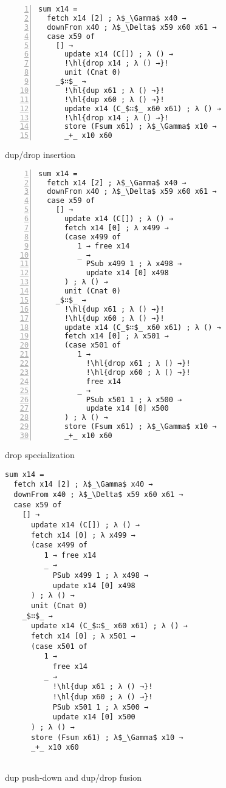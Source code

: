 \documentclass[9pt, twocolumn]{article}
\newcommand{\hl}[2][lightgray]{\colorbox{#1}{#2}}
\begin{document}
\begin{figure*}[hp]
\begin{mdframed}
\centering
\setlength{\fboxsep}{0pt} %
\begin{subfigure}[t]{0.44\textwidth}
\centering
\begin{lstlisting}[numbers=left]
sum x14 =
  fetch x14 [2] ; λ$_\Gamma$ x40 →
  downFrom x40 ; λ$_\Delta$ x59 x60 x61 →
  case x59 of
    [] →
      update x14 (C[]) ; λ () →
      !\hl{drop x14 ; λ () →}!
      unit (Cnat 0)
    _$∷$_ →
      !\hl{dup x61 ; λ () →}!
      !\hl{dup x60 ; λ () →}!
      update x14 (C_$∷$_ x60 x61) ; λ () →
      !\hl{drop x14 ; λ () →}!
      store (Fsum x61) ; λ$_\Gamma$ x10 →
      _+_ x10 x60
\end{lstlisting}
\caption{dup/drop insertion}
\label{fig:drop-insert}
\end{subfigure}\par\medskip
\begin{subfigure}[b]{0.44\textwidth}
\centering
\begin{lstlisting}[numbers=left]
sum x14 =
  fetch x14 [2] ; λ$_\Gamma$ x40 →
  downFrom x40 ; λ$_\Delta$ x59 x60 x61 →
  case x59 of
    [] →
      update x14 (C[]) ; λ () →
      fetch x14 [0] ; λ x499 →
      (case x499 of
         1 → free x14
         _ →
           PSub x499 1 ; λ x498 →
           update x14 [0] x498
      ) ; λ () →
      unit (Cnat 0)
    _$∷$_ →
      !\hl{dup x61 ; λ () →}!
      !\hl{dup x60 ; λ () →}!
      update x14 (C_$∷$_ x60 x61) ; λ () →
      fetch x14 [0] ; λ x501 →
      (case x501 of
         1 →
           !\hl{drop x61 ; λ () →}!
           !\hl{drop x60 ; λ () →}!
           free x14
         _ →
           PSub x501 1 ; λ x500 →
           update x14 [0] x500
      ) ; λ () →
      store (Fsum x61) ; λ$_\Gamma$ x10 →
      _+_ x10 x60
\end{lstlisting}
\caption{drop specialization}
\label{fig:drop-spec}
\end{subfigure}
\begin{subfigure}[b]{0.44\textwidth}
\begin{lstlisting}[showlines=true, numbers=none]
sum x14 =
  fetch x14 [2] ; λ$_\Gamma$ x40 →
  downFrom x40 ; λ$_\Delta$ x59 x60 x61 →
  case x59 of
    [] →
      update x14 (C[]) ; λ () →
      fetch x14 [0] ; λ x499 →
      (case x499 of
         1 → free x14
         _ →
           PSub x499 1 ; λ x498 →
           update x14 [0] x498
      ) ; λ () →
      unit (Cnat 0)
    _$∷$_ →
      update x14 (C_$∷$_ x60 x61) ; λ () →
      fetch x14 [0] ; λ x501 →
      (case x501 of
         1 →
           free x14
         _ →
           !\hl{dup x61 ; λ () →}!
           !\hl{dup x60 ; λ () →}!
           PSub x501 1 ; λ x500 →
           update x14 [0] x500
      ) ; λ () →
      store (Fsum x61) ; λ$_\Gamma$ x10 →
      _+_ x10 x60


\end{lstlisting}
\caption{dup push-down and dup/drop fusion}
\label{fig:dup/drop-fusion}
\end{subfigure}
\end{mdframed}
\caption{Perceus transformations}
\label{fig:perceus}
\end{figure*}
\end{document}
